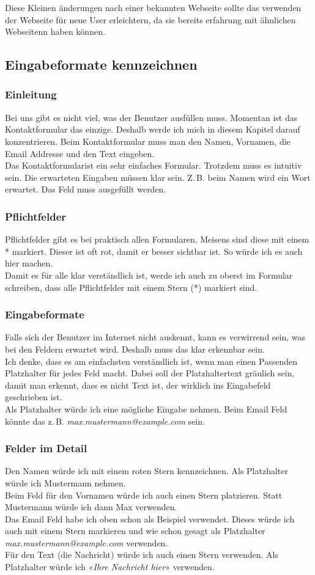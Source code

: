 \documentclass[10pt]{article}
\begin{document}
	Diese Kleinen änderungen nach einer bekannten Webseite sollte das verwenden der Webseite für neue User erleichtern, da sie bereits erfahrung mit ähnlichen Webseitenn haben können.
	
	
	\subsection{Eingabeformate kennzeichnen}
	\subsubsection{Einleitung}
	Bei uns gibt es nicht viel, was der Benutzer ausfüllen muss. Momentan ist das Kontaktformular das einzige. Deshalb werde ich mich in diesem Kapitel darauf konzentrieren. Beim Kontaktformular muss man den Namen, Vornamen, die Email Addresse und den Text eingeben.\\
	Das Kontaktformularist ein sehr einfaches Formular. Trotzdem muss es intuitiv sein. Die erwarteten Eingaben müssen klar sein. Z.\,B. beim Namen wird ein Wort erwartet. Das Feld muss ausgefüllt werden.
	\subsubsection{Pflichtfelder}
	Pflichtfelder gibt es bei praktisch allen Formularen. Meisens sind diese mit einem * markiert. Dieser ist oft rot, damit er besser sichtbar ist. So würde ich es auch hier machen.\\
	Damit es für alle klar verständlich ist, werde ich auch zu oberst im Formular schreiben, dass alle Pflichtfelder mit einem Stern (*) markiert sind.
	\subsubsection{Eingabeformate}
	Falls sich der Benutzer im Internet nicht auskennt, kann es verwirrend sein, was bei den Feldern erwartet wird. Deshalb muss das klar erkennbar sein.\\
	Ich denke, dass es am einfachsten verständlich ist, wenn man einen Passenden Platzhalter für jedes Feld macht. Dabei soll der Platzhaltertext gräulich sein, damit man erkennt, dass es nicht Text ist, der wirklich ins Eingabefeld geschrieben ist.\\
	Als Platzhalter würde ich eine mögliche Eingabe nehmen. Beim Email Feld könnte das z.\,B. \textit{max.mustermann@example.com} sein.
	\subsubsection{Felder im Detail}
	Den Namen würde ich mit einem roten Stern kennzeichnen. Als Platzhalter würde ich Mustermann nehmen.\\
	Beim Feld für den Vornamen würde ich auch einen Stern platzieren. Statt Mustermann würde ich dann Max verwenden.\\
	Das Email Feld habe ich oben schon als Beispiel verwendet. Dieses würde ich auch mit einem Stern markieren und wie schon gesagt als Platzhalter \textit{max.mustermann@example.com} verwenden.\\
	Für den Text (die Nachricht) würde ich auch einen Stern verwenden. Als Platzhalter würde ich «\textit{Ihre Nachricht hier}» verwenden.
\end{document}
